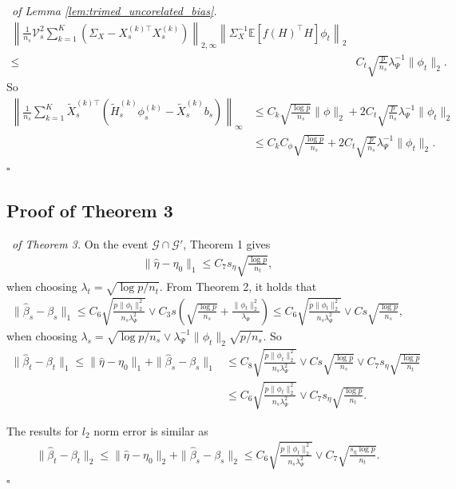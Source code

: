 \documentclass[12pt]{article}
\newenvironment{pf}{{\noindent \it Proof}\ }{\hfill $\square$\par}
\begin{document}
\begin{pf}{\it of Lemma \ref{lem:trimed_uncorelated_bias}. }
\begin{align*}
         \left\|\frac{1}{n_s}\mathcal{V}_s^2 \sum_{k=1}^K \left(\Sigma_X - X_s^{(k)\top}X_s^{(k)} \right)\right\|_{2,\infty}\left\|\Sigma_X^{-1}\mathbb{E}[f(H)^\top H]\phi_t\right\|_{2}\\ \le\ & C_t \sqrt{\frac{p}{n_s}}\lambda_\Psi^{-1} \|\phi_t\|_2. 
    \end{align*}
    So 
    \begin{align*}
        \left\|\frac{1}{n_s}\sum_{k=1}^K \tilde{X}_s^{(k)\top}\left(\tilde{H}_s^{(k)}\phi_s^{(k)}- \tilde{X}_s^{(k)}b_s\right)\right\|_{\infty} &\le C_k  \sqrt{\frac{\log p}{n_s}}\|\phi\|_2 +  2C_t \sqrt{\frac{p}{n_s}}\lambda_\Psi^{-1} \|\phi_t\|_2 \\&\le C_k C_\phi \sqrt{\frac{\log p}{n_s}} +  2C_t \sqrt{\frac{p}{n_s}}\lambda_\Psi^{-1} \|\phi_t\|_2.
    \end{align*}
\end{pf}


\subsection{Proof of Theorem 3}
\begin{pf}{\it of Theorem 3. }
    On the event $\mathcal{G}\cap\mathcal{G}'$, Theorem 1 gives 
    \begin{align*}
        \|\hat{\eta} -\eta_0\|_1 \le C_7 s_\eta \sqrt{\frac{\log p}{n_t}},
    \end{align*}
    when choosing $\lambda_t = \sqrt{\log p/n_t}$. 
    From Theorem 2, it holds that
    \begin{align*}
        \|\hat{\beta}_s - \beta_s\|_1 \le C_6 \sqrt{\frac{p\|\phi_t\|_2^2}{n_s\lambda_\Psi^2}} \vee C_3 s \left(\sqrt{\frac{\log p}{n_s}} + \frac{\|\phi_t\|_2^2}{\lambda_\Psi}\right) \le C_6 \sqrt{\frac{p\|\phi_t\|_2^2}{n_s\lambda_\Psi^2}} \vee C s\sqrt{\frac{\log p}{n_s}},
    \end{align*}
    when choosing $\lambda_s = \sqrt{\log p/n_s}\vee \lambda_\Psi^{-1}\|\phi_t\|_2\sqrt{p/n_s}$. 
    So 
    \begin{align*}
        \|\hat{\beta}_t - \beta_t\|_1 \le  \|\hat{\eta} -\eta_0\|_1 + \|\hat{\beta}_s - \beta_s\|_1  & \le C_8 \sqrt{\frac{p\|\phi_t\|_2^2}{n_s\lambda_\Psi^2}} \vee C s\sqrt{\frac{\log p}{n_s}} \vee C_7 s_\eta \sqrt{\frac{\log p}{n_t}} \\& \le 
        C_6 \sqrt{\frac{p\|\phi_t\|_2^2}{n_s\lambda_\Psi^2}} \vee C_7 s_\eta \sqrt{\frac{\log p}{n_t}}.
    \end{align*}
    
    The results for $l_2$ norm error is similar as
    \begin{align*}
        \|\hat{\beta}_t - \beta_t\|_2 \le  \|\hat{\eta} -\eta_0\|_2 + \|\hat{\beta}_s - \beta_s\|_2   \le 
        C_6 \sqrt{\frac{p\|\phi_t\|_2^2}{n_s\lambda_\Psi^2}} \vee C_7  \sqrt{\frac{s_\eta\log p}{n_t}}.
    \end{align*}
\end{pf}
\end{document}
